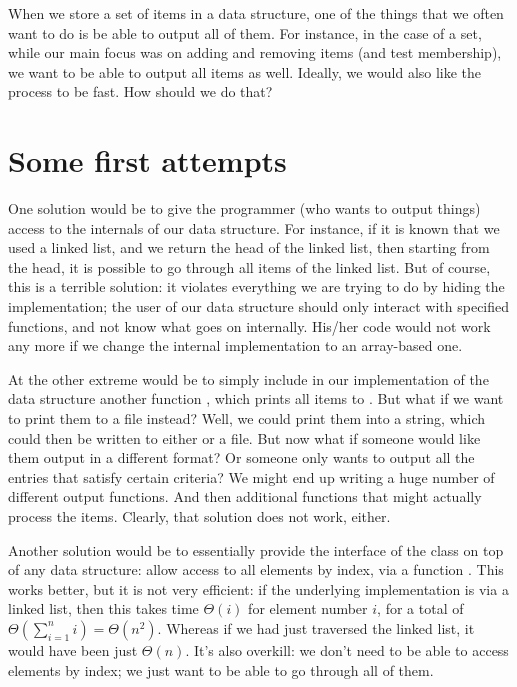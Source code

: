 When we store a set of items in a data structure, one of the things
that we often want to do is be able to output all of them.
For instance, in the case of a set, while our main focus was on adding
and removing items (and test membership), we want to be able to
output all items as well. Ideally, we would also like the process to
be fast. How should we do that?

\section{Some first attempts}
One solution would be to give the programmer (who wants to output
things) access to the internals of our data structure. 
For instance, if it is known that we used a linked list, and we return
the head of the linked list, then starting from the head, it is
possible to go through all items of the linked list.
But of course, this is a terrible solution: it violates everything we
are trying to do by hiding the implementation; the user of our data
structure should only interact with specified functions, and not know
what goes on internally. His/her code would not work any more if we
change the internal implementation to an array-based one.

At the other extreme would be to simply include in our implementation
of the data structure another function , which prints
all items to . But what if we want to print them to a file
instead? Well, we could print them into a string, which could then be
written to either  or a file. 
But now what if someone would like them output in a different format?
Or someone only wants to output all the entries that satisfy certain
criteria? We might end up writing a huge number of different output
functions. And then additional functions that might actually process
the items. Clearly, that solution does not work, either.

Another solution would be to essentially provide the interface
of the  class on top of any data structure: 
allow access to all elements by index, via a function . 
This works better, but it is not very efficient: if the underlying
implementation is via a linked list, then this takes time $\Theta(i)$
for element number $i$, for a total of $\Theta(\sum_{i=1}^n i) = \Theta(n^2)$.
Whereas if we had just traversed the linked list, it would have been 
just $\Theta(n)$. It's also overkill: we don't need to be able to
access elements by index; we just want to be able to go through all of
them.

